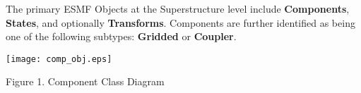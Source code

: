 %


The primary ESMF Objects at the Superstructure level include
{\bf Components}, {\bf States}, and optionally {\bf Transforms}.
Components are further identified as being one of the following
subtypes: {\bf Gridded} or {\bf Coupler}.

\begin{center}

\texttt{[image: comp\_obj.eps]}
   
Figure 1.  Component Class Diagram
   
\end{center}

